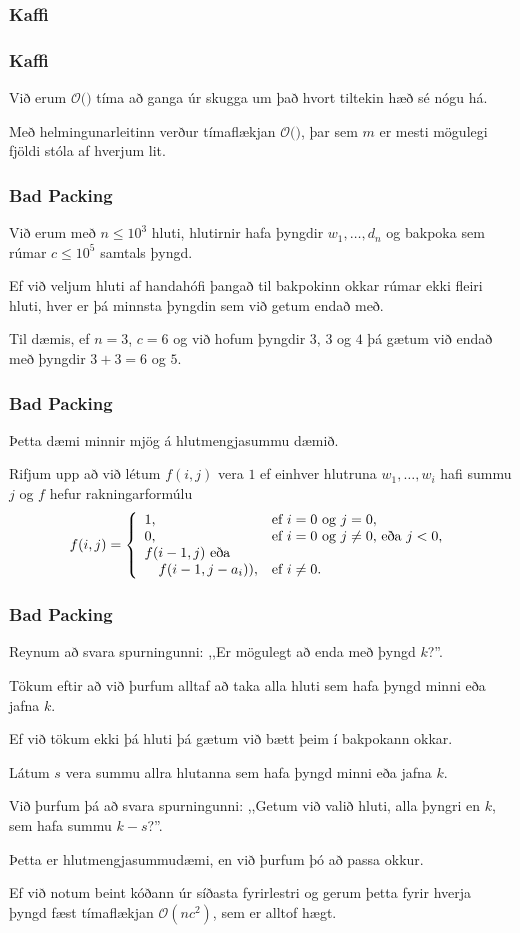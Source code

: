 {
	\frametitle{Kaffi}
}

{
	\frametitle{Kaffi}
	{
		\item<1-> Við erum $\mathcal{O}($$)$ tíma að ganga úr skugga um það hvort tiltekin hæð sé nógu há.
		\item<3-> Með helmingunarleitinn verður tímaflækjan $\mathcal{O}($\onslide<4->{$n \log m$}$)$,
					þar sem $m$ er mesti mögulegi fjöldi stóla af hverjum lit.
	}
}

{
	\frametitle{Bad Packing}
	{
		\item<1-> Við erum með $n \leq 10^3$ hluti, hlutirnir hafa þyngdir $w_1, \dots, d_n$ og bakpoka sem rúmar $c \leq 10^5$ samtals þyngd.
		\item<2-> Ef við veljum hluti af handahófi þangað til bakpokinn okkar rúmar ekki fleiri hluti, hver er þá minnsta þyngdin sem við getum endað með.
		\item<3-> Til dæmis, ef $n = 3$, $c = 6$ og við hofum þyngdir $3$, $3$ og $4$ þá gætum við endað með þyngdir $3 + 3 = 6$ og $5$.
	}
}

{
	\frametitle{Bad Packing}
	{
		\item<1-> Þetta dæmi minnir mjög á hlutmengjasummu dæmið.
		\item<2-> Rifjum upp að við létum $f(i, j)$ vera $1$ ef einhver hlutruna $w_1, \dots, w_i$ hafi summu $j$ og $f$ hefur rakningarformúlu
		\[
			f(i, j) =
			\left \{
			\env{array}
			{
				{l l}
				1, & \text{ef $i = 0$ og $j = 0$},\\
				0, & \text{ef $i = 0$ og $j \neq 0$, eða $j < 0$},\\
				f(i - 1, j) \text{ eða }\\
					\quad f(i - 1, j - a_i)), & \text{ef $i \neq 0$}.
			}
			\right .
		\]
	}
}

{
	\frametitle{Bad Packing}
	{
		\item<1-> Reynum að svara spurningunni: ,,Er mögulegt að enda með þyngd $k$?''.
		\item<2-> Tökum eftir að við þurfum alltaf að taka alla hluti sem hafa þyngd minni eða jafna $k$.
		\item<3-> Ef við tökum ekki þá hluti þá gætum við bætt þeim í bakpokann okkar.
		\item<4-> Látum $s$ vera summu allra hlutanna sem hafa þyngd minni eða jafna $k$.
		\item<5-> Við þurfum þá að svara spurningunni: ,,Getum við valið hluti, alla þyngri en $k$, sem hafa summu $k - s$?''.
		\item<6-> Þetta er hlutmengjasummudæmi, en við þurfum þó að passa okkur.
		\item<7-> Ef við notum beint kóðann úr síðasta fyrirlestri og gerum þetta fyrir hverja þyngd fæst tímaflækjan $\mathcal{O}(nc^2)$,
					sem er alltof hægt.
	}
}

